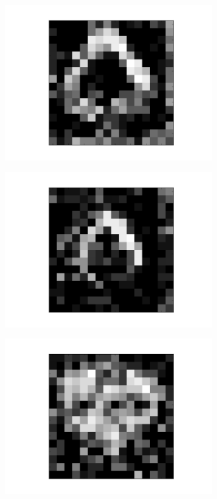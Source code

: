 \begin{figure}[h!]
	
	\begin{subfigure}{.25\textwidth}
  		\centering
  		\includegraphics[width=.8\linewidth]{imgs/poker/compl12.png}
  		\label{fig:sub1}
	\end{subfigure}%
	\begin{subfigure}{.25\textwidth}
  		\centering
  		\includegraphics[width=.8\linewidth]{imgs/poker/compl22.png}
  		\label{fig:sub1}
	\end{subfigure}%
	\begin{subfigure}{.25\textwidth}
  		\centering
  		\includegraphics[width=.8\linewidth]{imgs/poker/compl32.png}

\end{subfigure}
\end{figure}
